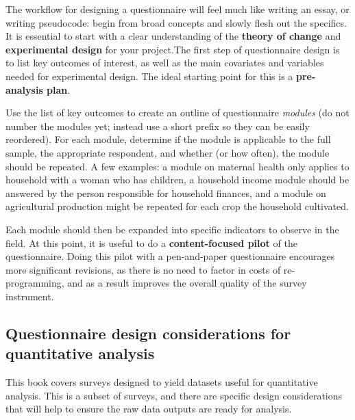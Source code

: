 The workflow for designing a questionnaire will feel much like writing an essay, or writing pseudocode: begin from broad concepts and slowly flesh out the specifics. It is essential to start with a clear understanding of the 
\textbf{theory of change} 
and \textbf{experimental design} for your project.The first step of questionnaire design is to list key outcomes of interest, as well as the main covariates and variables needed for experimental design. The ideal starting point for this is a 
\textbf{pre-analysis plan}. 

Use the list of key outcomes to create an outline of questionnaire \textit{modules} (do not number the modules yet; instead use a short prefix so they can be easily reordered). For each module, determine if the module is applicable to the full sample, the appropriate respondent, and whether (or how often), the module should be repeated. A few examples: a module on maternal health only applies to household with a woman who has children, a household income module should be answered by the person responsible for household finances, and a module on agricultural production might be repeated for each crop the household cultivated. 

Each module should then be expanded into specific indicators to observe in the field.
At this point, it is useful to do a 
\textbf{content-focused pilot}  of the questionnaire. 
Doing this pilot with a pen-and-paper questionnaire encourages more significant revisions, as there is no need to factor in costs of re-programming, and as a result improves the overall quality of the survey instrument. 

\subsection{Questionnaire design considerations for quantitative analysis}
This book covers surveys designed to yield datasets useful for quantitative analysis. This is a subset of surveys, and there are specific design considerations that will help to ensure the raw data outputs are ready for analysis. 

